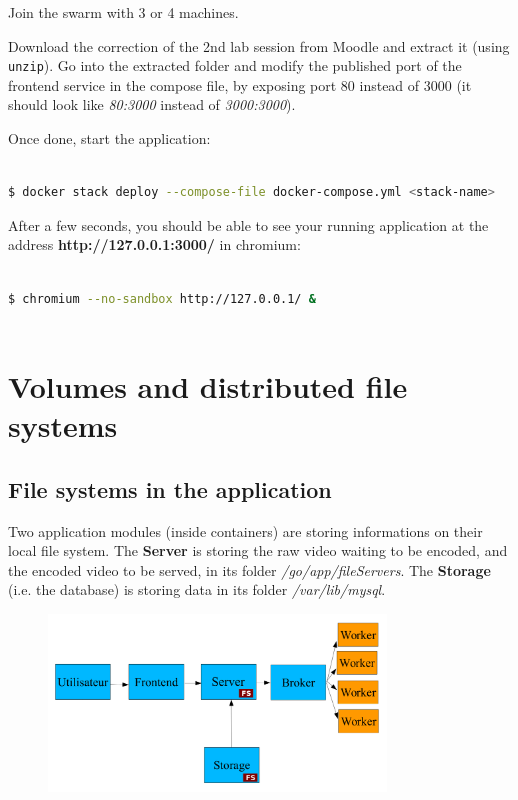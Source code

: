 \documentclass[a4paper,11pt]{exam}
\begin{document}
Join the swarm with 3 or 4 machines.

Download the correction of the 2nd lab session from Moodle and extract it (using \texttt{unzip}). 
Go into the extracted folder and modify the published port of the frontend service in the compose file, by exposing port 80 instead of 3000 (it should look like \textit{80:3000} instead of \textit{3000:3000}).

Once done, start the application:

\begin{lstlisting}[frame=single,language={sh}]  % Start your code-block

$ docker stack deploy --compose-file docker-compose.yml <stack-name>

\end{lstlisting}

After a few seconds, you should be able to see your running application at the address \textbf{http://127.0.0.1:3000/} in chromium:

\begin{lstlisting}[frame=single,language={sh}]  % Start your code-block

$ chromium --no-sandbox http://127.0.0.1/ &
		
\end{lstlisting}

\clearpage

\section{Volumes and distributed file systems}

\subsection{File systems in the application}

Two application modules (inside containers) are storing informations on their local file system. 
The \textbf{Server} is storing the raw video waiting to be encoded, and the encoded video to be served, in its folder \textit{/go/app/fileServers}. 
The \textbf{Storage} (i.e. the database) is storing data in its folder \textit{/var/lib/mysql}. 

\begin{figure}[!ht]
	\centering
	\includegraphics[width=0.8\textwidth]{fig/architecture.png}
	\label{fig:architecture}
\end{figure}
\end{document}

